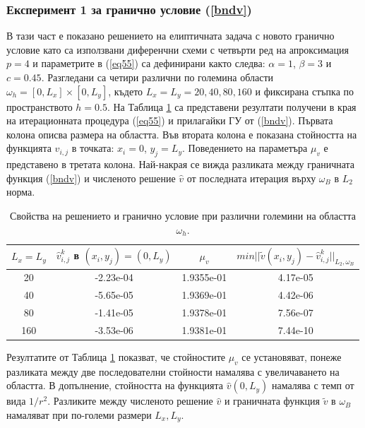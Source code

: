 \documentclass[a4paper]{article}
\newcommand{\rf}[1]{(\ref{#1})}
\theoremstyle{remark}
\begin{document}
\subsubsection{Експеримент 1 за  гранично условие \rf{bndv}}
В тази част е показано решението на елиптичната задача с новото гранично условие като са използвани диференчни схеми с четвърти ред на апроксимация $p=4$ и параметрите в \rf{eq55} са дефинирани както следва: $\alpha = 1$, $\beta = 3$ и $c=0.45$. Разгледани са четири различни по големина области $\omega_h = [0, L_x] \times [0, L_y]$, където $L_x = L_y = 20, 40, 80, 160$ и фиксирана стъпка по пространството $h=0.5$. На Таблица \ref{tab:valBnd1} са представени резултати получени в края на итерационната процедура \rf{eq55} и прилагайки ГУ от \rf{bndv}. Първата колона описва размера на областта. Във втората колона е показана стойността на функцията $\widehat{v}_{i,j}$ в точката: ${x}_i = 0$, $ {y}_j =   L_{ y}$. Поведението на параметъра $\mu_v$ е представено в третата колона. Най-накрая се вижда разликата между граничната функция \rf{bndv} и численото решение $\widehat{v}$ от последната итерация върху $\omega_B$ в $L_2$ норма.
\begin{table}[ht]
\centering
		\begin{tabular}{||c||c|c|c||}
			\hline
			\hline
      $ L_{ x} = L_{ y}$        &         $\widehat{v}_{i,j}^k$ в  $({x}_i, {y}_j) = (0, L_{ y})$    &    $\mu_v$  &   \mbox{$min|| \tilde v( x_i, y_j) - \widehat v ^k_{i,j} ||_{L_2,\omega_B}$}\\
   			\hline
			\hline
      20    & -2.23e-04    &  1.9355e-01  &     4.17e-05  \\
               	 \hline
    40      & -5.65e-05   &   1.9369e-01    &    4.42e-06 \\
			\hline 	
      80    & -1.41e-05  &      1.9378e-01      &       7.56e-07  \\
			\hline 	
     160     & -3.53e-06  &    1.9381e-01        &     7.44e-10 \\
		   \hline
	             \hline
                     \end{tabular}
\caption{Свойства на решението и гранично условие при различни големини на областта $\omega_h$.}
\label{tab:valBnd1}
\end{table}
\FloatBarrier
Резултатите от Таблица \ref{tab:valBnd1} показват, че стойностите $\mu_v$ се установяват, понеже разликата между две последователни стойности намалява с увеличаването на областта. В допълнение, стойността на функцията $\widehat v(0,L_y)$ намалява с темп от вида $1/r^2$. Разликите между численото решение $\widehat v$ и граничната функция $\tilde v$ в $\omega_B$ намаляват при по-големи размери $L_x, L_y$. 
\end{document}
